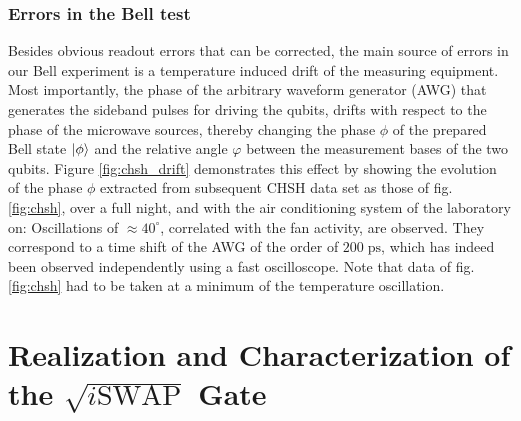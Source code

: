\subsubsection{Errors in the Bell test} 

Besides obvious readout errors that can be corrected, the main source of errors in our Bell experiment is a temperature induced drift of the measuring equipment. Most importantly, the phase of the arbitrary waveform generator (AWG) that generates the sideband pulses for driving the qubits, drifts with respect to the phase of the microwave sources, thereby changing the phase $\phi$ of the prepared Bell state $\left| \phi \right>$ and the relative angle $\varphi$ between the measurement bases of the two qubits. Figure \ref{fig:chsh_drift} demonstrates this effect by showing the evolution of the phase $\phi$ extracted from subsequent CHSH data set as those of fig. \ref{fig:chsh}, over a full night, and with the air conditioning system of the laboratory on: Oscillations of $\approx 40^\circ$, correlated with the fan activity, are observed. They correspond to a time shift of the AWG of the order of $200\;\mathrm{ps}$, which has indeed been observed independently using a fast oscilloscope. Note that data of fig. \ref{fig:chsh} had to be taken at a minimum of the temperature oscillation.

\section{Realization and Characterization of the $\sqrt{i\mathrm{SWAP}}$ Gate}

